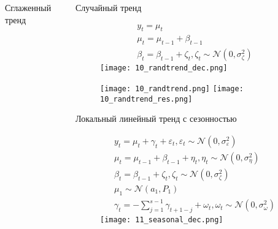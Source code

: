 \documentclass{beamer}
\begin{document}
\begin{frame}[fragile]
\begin{columns}[T]
\begin{column}{.32\textwidth}
\begin{columns}[T]
\begin{column}{.5\textwidth}
\begin{block}{Сглаженный тренд}
\end{block}
\end{column}

\end{columns}
\end{column}

\begin{column}{.32\textwidth}

\begin{block}{Случайный тренд}

\begin{figure}[htb]
\begin{gather*}
y_t = \mu_t
\\
\mu_t = \mu_{t-1} + \beta_{t-1}
\\
\beta_t = \beta_{t-1} + \zeta_t, \zeta_t \sim \mathcal{N}(0, \sigma_\zeta^2)
\end{gather*}
\endminipage \hfill
{}
\texttt{[image: 10\_randtrend\_dec.png]}
\endminipage\hfill
\end{figure}

\begin{figure}[htb]
  \texttt{[image: 10\_randtrend.png]}
\endminipage\hfill
{}
  \texttt{[image: 10\_randtrend\_res.png]}
\endminipage\hfill
\end{figure}
\end{block}

\begin{block}{Локальный линейный тренд с сезонностью}

\begin{figure}[htb]
\begin{gather*}
y_t = \mu_t + \gamma_t + \varepsilon_t,  \varepsilon_t \sim \mathcal{N}(0, \sigma_\varepsilon^2)
\\
\mu_t = \mu_{t-1} + \beta_{t-1} + \eta_t, \eta_t \sim \mathcal{N}(0, \sigma^2_\eta)
\\
\beta_t = \beta_{t-1} + \zeta_t, \zeta_t \sim \mathcal{N}(0, \sigma_\zeta^2)
\\
\mu_1 \sim \mathcal{N}(a_1, P_1) 
\\
\gamma_t = - \sum_{j=1}^{s-1} \gamma_{t+1-j} + \omega_t, \omega_t \sim \mathcal{N}(0, \sigma_\omega^2)
\end{gather*}
\endminipage \hfill
{}
\texttt{[image: 11\_seasonal\_dec.png]}
\endminipage\hfill
\end{figure}


\end{block}
\end{column}
\end{columns}
\end{frame}
\end{document}
